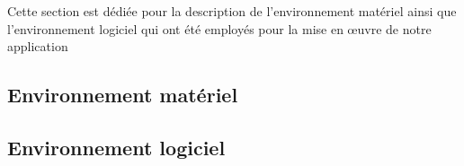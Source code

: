 Cette section est dédiée pour la description de l’environnement matériel ainsi que l’environnement logiciel qui ont été employés pour la mise en œuvre de notre application
    \subsection{Environnement matériel}
    
    \vspace{-0.5cm}
    \subsection{Environnement logiciel}
    
